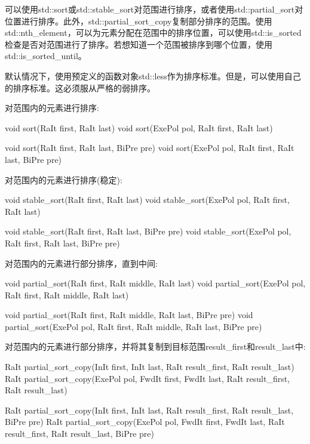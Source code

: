 可以使用std::sort或std::stable\_sort对范围进行排序，或者使用std::partial\_sort对位置进行排序。此外，std::partial\_sort\_copy复制部分排序的范围。使用std::nth\_element，可以为元素分配在范围中的排序位置，可以使用std::is\_sorted检查是否对范围进行了排序。若想知道一个范围被排序到哪个位置，使用std::is\_sorted\_until。

默认情况下，使用预定义的函数对象std::less作为排序标准。但是，可以使用自己的排序标准。这必须服从严格的弱排序。

对范围内的元素进行排序:

\begin{cpp}
void sort(RaIt first, RaIt last)
void sort(ExePol pol, RaIt first, RaIt last)

void sort(RaIt first, RaIt last, BiPre pre)
void sort(ExePol pol, RaIt first, RaIt last, BiPre pre)
\end{cpp}

对范围内的元素进行排序(稳定):

\begin{cpp}
void stable_sort(RaIt first, RaIt last)
void stable_sort(ExePol pol, RaIt first, RaIt last)

void stable_sort(RaIt first, RaIt last, BiPre pre)
void stable_sort(ExePol pol, RaIt first, RaIt last, BiPre pre)
\end{cpp}

对范围内的元素进行部分排序，直到中间:

\begin{cpp}
void partial_sort(RaIt first, RaIt middle, RaIt last)
void partial_sort(ExePol pol, RaIt first, RaIt middle, RaIt last)

void partial_sort(RaIt first, RaIt middle, RaIt last, BiPre pre)
void partial_sort(ExePol pol, RaIt first, RaIt middle, RaIt last, BiPre pre)
\end{cpp}

对范围内的元素进行部分排序，并将其复制到目标范围result\_first和result\_last中:

\begin{cpp}
RaIt partial_sort_copy(InIt first, InIt last,
					   RaIt result_first, RaIt result_last)
RaIt partial_sort_copy(ExePol pol, FwdIt first, FwdIt last,
					   RaIt result_first, RaIt result_last)

RaIt partial_sort_copy(InIt first, InIt last,
					   RaIt result_first, RaIt result_last, BiPre pre)
RaIt partial_sort_copy(ExePol pol, FwdIt first, FwdIt last,
					   RaIt result_first, RaIt result_last, BiPre pre)
\end{cpp}

